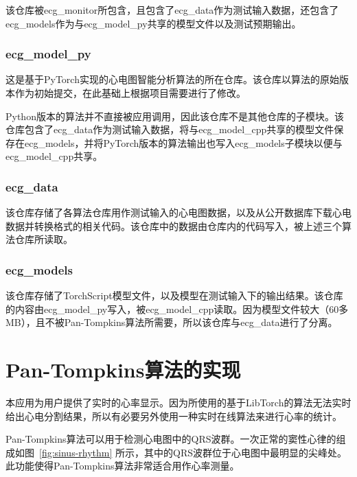 该仓库被ecg\_monitor所包含，且包含了ecg\_data作为测试输入数据，还包含了ecg\_models作为与ecg\_model\_py共享的模型文件以及测试预期输出。

\subsubsection{ecg\_model\_py}\label{subsubsec:repo-py}

这是基于PyTorch实现的心电图智能分析算法的所在仓库。该仓库以算法的原始版本作为初始提交，在此基础上根据项目需要进行了修改。

Python版本的算法并不直接被应用调用，因此该仓库不是其他仓库的子模块。该仓库包含了ecg\_data作为测试输入数据，将与ecg\_model\_cpp共享的模型文件保存在ecg\_models，并将PyTorch版本的算法输出也写入ecg\_models子模块以便与ecg\_model\_cpp共享。

\subsubsection{ecg\_data}\label{subsubsec:repo-data}

该仓库存储了各算法仓库用作测试输入的心电图数据，以及从公开数据库下载心电数据并转换格式的相关代码。该仓库中的数据由仓库内的代码写入，被上述三个算法仓库所读取。

\subsubsection{ecg\_models}\label{subsubsec:repo-models}

该仓库存储了TorchScript模型文件，以及模型在测试输入下的输出结果。该仓库的内容由ecg\_model\_py写入，被ecg\_model\_cpp读取。因为模型文件较大（60多MB），且不被Pan-Tompkins算法所需要，所以该仓库与ecg\_data进行了分离。


\section{Pan-Tompkins算法的实现}\label{sec:pan-tompkins}

本应用为用户提供了实时的心率显示。因为所使用的基于LibTorch的算法无法实时给出心电分割结果，所以有必要另外使用一种实时在线算法来进行心率的统计。

Pan-Tompkins算法\cite{panRealTimeQRSDetection1985}可以用于检测心电图中的QRS波群。一次正常的窦性心律的组成如图~\ref{fig:sinus-rhythm} 所示，其中的QRS波群位于心电图中最明显的尖峰处。此功能使得Pan-Tompkins算法非常适合用作心率测量。

